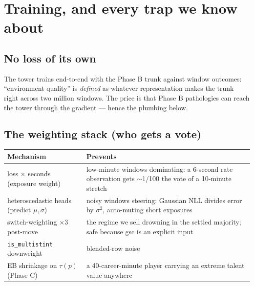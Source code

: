 \documentclass[11pt]{article}
\begin{document}
\section{Training, and every trap we know about}
\subsection{No loss of its own}
The tower trains end-to-end with the Phase B trunk against window outcomes:
``environment quality'' is \emph{defined} as whatever representation makes the
trunk right across two million windows. The price is that Phase B pathologies
can reach the tower through the gradient --- hence the plumbing below.

\subsection{The weighting stack (who gets a vote)}
\begin{center}
\begin{tabular}{@{}p{}p{}@{}}
\toprule
\textbf{Mechanism} & \textbf{Prevents} \\
\midrule
loss $\times$ seconds (exposure weight) & low-minute windows dominating: a
6-second rate observation gets $\sim$1/100 the vote of a 10-minute stretch \\
heteroscedastic heads (predict $\mu,\sigma$) & noisy windows steering: Gaussian
NLL divides error by $\sigma^2$, auto-muting short exposures \\
switch-weighting $\times 3$ post-move & the regime we sell drowning in the
settled majority; safe because gsc is an explicit input \\
\texttt{is\_multistint} downweight & blended-row noise \\
EB shrinkage on $\tau(p)$ (Phase C) & a 40-career-minute player carrying an
extreme talent value anywhere \\
\bottomrule
\end{tabular}
\end{center}
\end{document}

